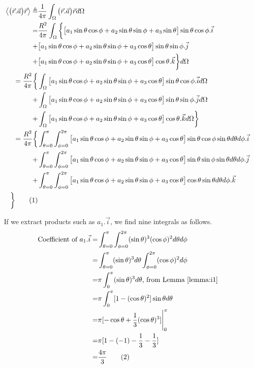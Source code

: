 \documentclass[]{article}
\newcommand\numberthis{\addtocounter{equation}{1}\tag{\theequation}}
\begin{document}
\begin{align*}
\left\langle \big(\vec{r}.\vec{a}\big)\vec{r} \right\rangle \triangleq& \frac{1}{4\pi}\int_{\Omega}\big(\vec{r}.\vec{a}\big)\vec{r} d\Omega \\
=&  \frac{ R^2}{4\pi}\int_{\Omega} \bigg\{ \big[a_1\sin\theta\cos\phi + a_2\sin\theta\sin\phi + a_3 \sin\theta\big] \sin\theta\cos\phi.\vec{i}\\ +& \big[a_1\sin\theta\cos\phi + a_2\sin\theta\sin\phi + a_3 \cos\theta\big]\sin\theta\sin\phi .\vec{j}\\
+& \big[a_1\sin\theta\cos\phi + a_2\sin\theta\sin\phi + a_3 \cos\theta\big] \cos\theta. \vec{k}\bigg\}d\Omega\\
= \frac{ R^2}{4\pi} \bigg\{&\int_{\Omega}\big[a_1\sin\theta\cos\phi + a_2\sin\theta\sin\phi + a_3 \cos\theta\big] \sin\theta\cos\phi.\vec{i}d\Omega\\ +& \int_{\Omega}\big[a_1\sin\theta\cos\phi + a_2\sin\theta\sin\phi + a_3 \cos\theta\big]\sin\theta\sin\phi .\vec{j}d\Omega\\
+& \int_{\Omega}\big[a_1\sin\theta\cos\phi + a_2\sin\theta\sin\phi + a_3 \cos\theta\big] \cos\theta. \vec{k} d\Omega\bigg\}\\
= \frac{ R^2}{4\pi} \bigg\{&\int_{\theta=0}^{\pi}\int_{\phi=0}^{2\pi}\big[a_1\sin\theta\cos\phi + a_2\sin\theta\sin\phi + a_3 \cos\theta\big] \sin\theta\cos\phi\sin\theta d\theta d\phi.\vec{i}\\
 +& \int_{\theta=0}^{\pi}\int_{\phi=0}^{2\pi}\big[a_1\sin\theta\cos\phi + a_2\sin\theta\sin\phi + a_3 \cos\theta\big]\sin\theta\sin\phi \sin\theta d\theta d\phi.\vec{j}\\
+& \int_{\theta=0}^{\pi}\int_{\phi=0}^{2\pi}\big[a_1\sin\theta\cos\phi + a_2\sin\theta\sin\phi + a_3 \cos\theta\big] \cos\theta \sin\theta d\theta d\phi.\vec{k}\\ \bigg\} \numberthis \label{eq:big-int}
\end{align*}

If we extract products such as $a_1.\vec{i}$, we find nine integrals as follows.
\begin{align*}
\text{Coefficient of }a_1.\vec{i} =&\int_{\theta=0}^{\pi}\int_{\phi=0}^{2\pi}(\sin\theta)^3(\cos\phi)^2 d\theta d\phi\\
=&\int_{\theta=0}^{\pi}(\sin\theta)^3d\theta\int_{\phi=0}^{2\pi}(\cos\phi)^2  d\phi\\
=&\pi \int_{0}^{\pi}(\sin\theta)^3d\theta\text{, from Lemma \ref{lemma:i1}}\\
=&\pi \int_{0}^{\pi} [1-(\cos \theta)^2] \sin\theta d\theta  \\
=& \pi [-\cos\theta+\frac{1}{3}(\cos\theta)^3]\Bigg|_0^{\pi} \\
=& \pi [1-(-1)-\frac{1} {3}-\frac{1} {3}] \\
=& \frac{4\pi}{3}\numberthis \label{eq:a1-i}
\end{align*}
\end{document}
